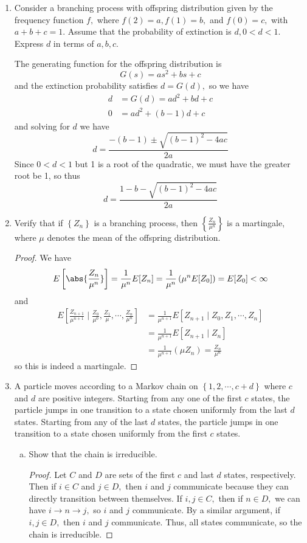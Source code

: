 \documentclass{article}
\begin{document}
\begin{enumerate}
	\item Consider a branching process with offspring distribution given by the frequency function $f,$ where $f(2)=a, f(1)=b,$ and $f(0)=c,$ with $a+b+c=1.$ Assume that the probability of extinction is $d, 0<d<1.$ Express $d$ in terms of $a, b, c.$
		\begin{soln}
			The generating function for the offspring distribution is
			\[G(s)=as^2+bs+c\]
			and the extinction probability satisfies $d=G(d),$ so we have
			\begin{align*}
				d &= G(d)=ad^2+bd+c \\
				0 &= ad^2+(b-1)d+c
			\end{align*}
			and solving for $d$ we have
			\[d=\frac{-(b-1)\pm\sqrt{(b-1)^2-4ac}}{2a}\]
			Since $0<d<1$ but 1 is a root of the quadratic, we must have the greater root be 1, so thus
			\[d=\frac{1-b-\sqrt{(b-1)^2-4ac}}{2a}\]
		\end{soln}

	\item Verify that if $\left\{ Z_n \right\}$ is a branching process, then $\left\{ \frac{Z_n}{\mu^n} \right\}$ is a martingale, where $\mu$ denotes the mean of the offspring distribution.
		\begin{proof}
			We have
			\begin{align*}
				E\left[ \abs{\frac{Z_n}{\mu^n}} \right] = \frac{1}{\mu^n} E[Z_n] = \frac{1}{\mu^n} \left(\mu^n E[Z_0]\right) = E[Z_0] < \infty
			\end{align*}
			and
			\begin{align*}
				E\left[ \frac{Z_{n+1}}{\mu^{n+1}}\mid \frac{Z_0}{\mu^0}, \frac{Z_1}{\mu}, \cdots, \frac{Z_n}{\mu^n} \right] &= \frac{1}{\mu^{n+1}} E[Z_{n+1}\mid Z_0, Z_1, \cdots, Z_n] \\
				&= \frac{1}{\mu^{n+1}} E[Z_{n+1}\mid Z_n] \\
				&= \frac{1}{\mu^{n+1}}(\mu Z_n) = \frac{Z_n}{\mu^n}
			\end{align*}
			so this is indeed a martingale.
		\end{proof}

	\item A particle moves according to a Markov chain on $\left\{ 1, 2, \cdots, c+d \right\}$ where $c$ and $d$ are positive integers. Starting from any one of the first $c$ states, the particle jumps in one transition to a state chosen uniformly from the last $d$ states. Starting from any of the last $d$ states, the particle jumps in one transition to a state chosen uniformly from the first $c$ states.
		\begin{enumerate}[(a)]
			\item Show that the chain is irreducible.
				\begin{proof}
					Let $C$ and $D$ are sets of the first $c$ and last $d$ states, respectively. Then if $i\in C$ and $j\in D,$ then $i$ and $j$ communicate because they can directly transition between themselves. If $i, j\in C,$ then if $n\in D,$ we can have $i\to n\to j,$ so $i$ and $j$ communicate. By a similar argument, if $i, j\in D,$ then $i$ and $j$ communicate. Thus, all states communicate, so the chain is irreducible.
				\end{proof}


\end{enumerate}
\end{enumerate}
\end{document}
